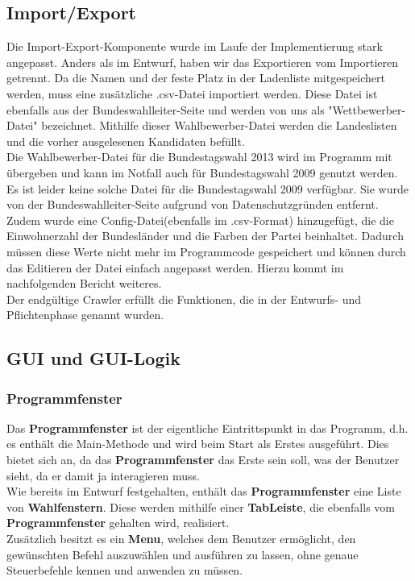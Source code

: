 \documentclass[12pt,a4paper,titlepage]{article}
\newcommand{\myma}{\fontfamily{pcr}\selectfont \textbf}
\begin{document}
\subsection{Import/Export}	
Die Import-Export-Komponente wurde im Laufe der Implementierung stark angepasst. Anders als im Entwurf, haben wir das Exportieren vom Importieren getrennt. Da die Namen und der feste Platz in der Ladenliste mitgespeichert werden, muss eine zusätzliche .csv-Datei importiert werden. Diese Datei ist ebenfalls aus der Bundeswahlleiter-Seite und werden von uns als "Wettbewerber-Datei" bezeichnet. Mithilfe dieser Wahlbewerber-Datei werden die Landeslisten und die vorher ausgelesenen Kandidaten befüllt. \\
Die Wahlbewerber-Datei für die Bundestagswahl 2013 wird im Programm mit übergeben und kann im Notfall auch für Bundestagswahl 2009 genutzt werden. Es ist leider keine solche Datei für die Bundestagswahl 2009 verfügbar. Sie wurde von der Bundeswahlleiter-Seite aufgrund von Datenschutzgründen entfernt. \\
Zudem wurde eine Config-Datei(ebenfalls im .csv-Format) hinzugefügt, die die Einwohnerzahl der Bundesländer und die Farben der Partei beinhaltet. Dadurch müssen diese Werte nicht mehr im Programmcode gespeichert und können durch das Editieren der Datei einfach angepasst werden. Hierzu kommt im nachfolgenden Bericht weiteres.\\
Der endgültige Crawler erfüllt die Funktionen, die in der Entwurfs- und Pflichtenphase genannt wurden.

\subsection{GUI und GUI-Logik}

\subsubsection{Programmfenster}
Das {\myma{Programmfenster}} ist der eigentliche Eintrittspunkt in das Programm, d.h. es enthält die Main-Methode und wird beim Start als Erstes ausgeführt. Dies bietet sich an, da das {\myma{Programmfenster}} das Erste sein soll, was der Benutzer sieht, da er damit ja interagieren muss. \\
Wie bereits im Entwurf festgehalten, enthält das {\myma{Programmfenster}} eine Liste von {\myma{Wahlfenstern}}. Diese werden mithilfe einer {\myma{TabLeiste}}, die ebenfalls vom {\myma{Programmfenster}} gehalten wird, realisiert. \\
Zusätzlich besitzt es ein {\myma{Menu}}, welches dem Benutzer ermöglicht, den gewünschten Befehl auszuwählen und ausführen zu lassen, ohne genaue Steuerbefehle kennen und anwenden zu müssen. \\
\end{document}
